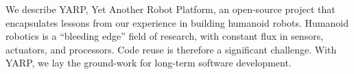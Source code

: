 
We describe YARP, Yet Another Robot Platform, an open-source project
that encapsulates lessons from our experience in building humanoid
robots.  Humanoid robotics is a ``bleeding edge'' field of 
research, with constant flux in sensors, actuators, and 
processors.  Code reuse is therefore a significant 
challenge.  With YARP, we lay the ground-work for long-term
software development.
